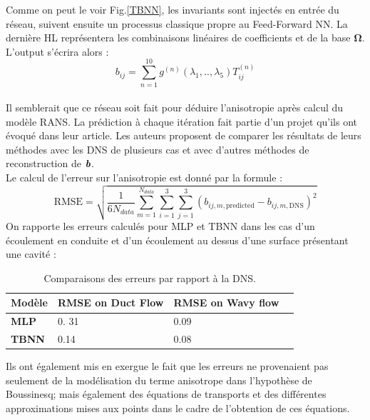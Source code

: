 \documentclass[a4paper,12pt]{report}
\newcommand{\bepar}[1]{
	\left( #1 \right)  
}
\newcommand\bk{\color{black}}
\newcommand{\dgreen}{\color{dgreen}}
\newcommand{\dpurple}{\color{indian}}
\numberwithin{equation}{section} %
\begin{document}
Comme on peut le voir Fig.\eqref{TBNN}, les invariants sont injectés en entrée du réseau, suivent ensuite un processus classique propre au Feed-Forward NN. La dernière HL représentera les combinaisons linéaires de coefficients et de la base $\mathbf{\Omega}$. \\
L'output s'écrira alors : $$ b_{ij} = \sum_{n=1}^{10} g^{(n)}(\lambda_1,..,\lambda_5) T_{ij}^{(n)}$$ \\

\noindent Il semblerait que ce réseau soit fait pour déduire l'anisotropie après calcul du modèle RANS. La prédiction à chaque itération fait partie d'un projet qu'ils ont évoqué dans leur article. Les auteurs proposent de comparer les résultats de leurs méthodes avec les DNS de plusieurs cas et avec d'autres méthodes de reconstruction de $\textbf{\textit{b}}$.\\
Le calcul de l'erreur sur l'anisotropie est donné par la formule : 
\begin{equation*}
\text{RMSE} = \sqrt{\frac{1}{6N_{data}} \sum^{N_{data}}_{m=1} \sum^{3}_{i=1} \sum^3_{j=1} \bepar{b_{ij,m,\text{predicted}} - b_{ij,m,\text{DNS}}}^2  }
\end{equation*}
On rapporte les erreurs calculés pour MLP et TBNN dans les cas d'un écoulement en conduite et d'un écoulement au dessus d'une surface présentant une cavité : \\

 \begin{table}[!ht]
\centering
		\begin{tabular}{M{.3\textwidth} M{.3\textwidth} M{.3\textwidth} N}
		Modèle & RMSE on Duct Flow & RMSE on Wavy flow &\\[0.15cm]\hline
		\dgreen \textbf{MLP} \bk & 0. 31 & 0.09 &\\[0.2cm]		
		\dpurple \textbf{TBNN} \bk& 0.14 & 0.08 &\\[0.2cm]
		\end{tabular}
		\caption{Comparaisons des erreurs par rapport à la DNS.}
\end{table}

Ils ont également mis en exergue le fait que les erreurs ne provenaient pas seulement de la modélisation du terme anisotrope dans l'hypothèse de Boussinesq; mais également des équations de transports et des différentes approximations mises aux points dans le cadre de l'obtention de ces équations.\\
\end{document}
